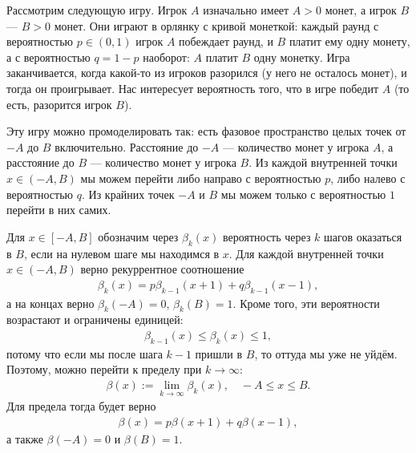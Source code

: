 \documentclass[../main.tex]{subfiles}
\begin{document}
 \begin{exmpl}

  Рассмотрим следующую игру. Игрок $ A $ изначально имеет $ A > 0 $ монет, а игрок $ B $ --- $ B > 0 $ монет. Они играют в орлянку с кривой монеткой: каждый раунд с вероятностью $ p \in (0,1) $ игрок $ A $ побеждает раунд, и $ B $ платит ему одну монету, а с вероятностью $ q = 1 - p $ наоборот: $ A $ платит $ B $ одну монетку. Игра заканчивается, когда какой-то из игроков разорился (у него не осталось монет), и тогда он проигрывает. Нас интересует вероятность того, что в игре победит $ A $ (то есть, разорится игрок $ B $).

  Эту игру можно промоделировать так: есть фазовое пространство целых точек от $ -A $ до $ B $ включительно. Расстояние до $ -A $ --- количество монет у игрока $ A $, а расстояние до $ B $ --- количество монет у игрока $ B $. Из каждой внутренней точки $ x \in (-A, B) $ мы можем перейти либо направо с вероятностью $ p $, либо налево с вероятностью $ q $. Из крайних точек $ -A $ и $ B $ мы можем только с вероятностью $ 1 $ перейти в них самих.

  Для $ x \in [-A,B] $ обозначим через $ \beta_k(x) $ вероятность через $ k $ шагов оказаться в $ B $, если на нулевом шаге мы находимся в $ x $.  Для каждой внутренней точки $ x \in (-A,B) $ верно рекуррентное соотношение
  \begin{align*}
   \beta_k(x) = p \beta_{k-1}(x+1) + q \beta_{k-1}(x-1),
  \end{align*} а на концах верно $ \beta_k(-A) = 0 $, $ \beta_k(B) = 1 $. Кроме того, эти вероятности возрастают и ограничены единицей:
  \begin{align*}
   \beta_{k-1}(x) \leqslant \beta_k(x) \leqslant 1,
  \end{align*} потому что если мы после шага $ k-1 $ пришли в $ B $, то оттуда мы уже не уйдём. Поэтому, можно перейти к пределу при $ k \to \infty $:
  \begin{align*}
   \beta(x) := \lim_{k \to \infty} \beta_k(x), \quad -A \leqslant x \leqslant B.
  \end{align*} Для предела тогда будет верно
  \begin{align}
   \label{eq:gambler_ruin:rec_beta}
   \beta(x) = p\beta(x+1) +q\beta(x-1),
  \end{align} а также $ \beta(-A) = 0 $ и $ \beta(B) = 1 $. 


\end{exmpl}
\end{document}
